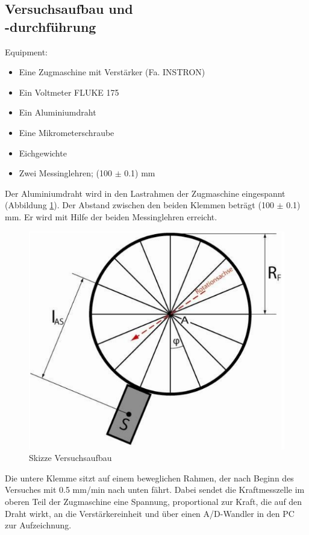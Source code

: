 \documentclass[12pt,a4paper]{article}
\begin{document}
\begin{multicols}{2}
\subsection{Versuchsaufbau und \\-durchführung}
Equipment:\\
\begin{itemize}
	\item Eine Zugmaschine mit Verstärker (Fa. INSTRON)
	\item Ein Voltmeter FLUKE 175
	\item Ein Aluminiumdraht
	\item Eine Mikrometerschraube
	\item Eichgewichte
	\item Zwei Messinglehren; (100 $\pm$ 0.1) mm
\end{itemize}
Der Aluminiumdraht wird in den Lastrahmen der Zugmaschine eingespannt (Abbildung \ref{fig:elastizität}). Der Abstand zwischen den beiden Klemmen beträgt (100 $\pm$ 0.1) mm. Er wird mit Hilfe der beiden Messinglehren erreicht.\\
\begin{figure}[h]
	\centering
	\includegraphics[scale=0.45]{./figure/speichenrad.png}
	\caption{Skizze Versuchsaufbau}
	\label{fig:elastizität}
\end{figure}
Die untere Klemme sitzt auf einem beweglichen Rahmen, der nach Beginn des Versuches mit 0.5 mm/min nach unten fährt. Dabei sendet die Kraftmesszelle im oberen Teil der Zugmaschine eine Spannung, proportional zur Kraft, die auf den Draht wirkt, an die Verstärkereinheit und über einen A/D-Wandler in den PC zur Aufzeichnung.\\

\end{multicols}
\end{document}
